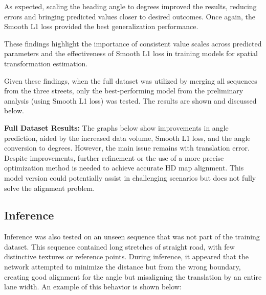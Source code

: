 As expected, scaling the heading angle to degrees improved the results, reducing errors and bringing predicted values closer to desired outcomes. Once again, the Smooth L1 loss provided the best generalization performance.

These findings highlight the importance of consistent value scales across predicted parameters and the effectiveness of Smooth L1 loss in training models for spatial transformation estimation.

Given these findings, when the full dataset was utilized by merging all sequences from the three streets, only the best-performing model from the preliminary analysis (using Smooth L1 loss) was tested. The results are shown and discussed below.

\textbf{Full Dataset Results:} The graphs below show improvements in angle prediction, aided by the increased data volume, Smooth L1 loss, and the angle conversion to degrees. However, the main issue remains with translation error. Despite improvements, further refinement or the use of a more precise optimization method is needed to achieve accurate HD map alignment. This model version could potentially assist in challenging scenarios but does not fully solve the alignment problem.

\subsection{Inference}
Inference was also tested on an unseen sequence that was not part of the training dataset. This sequence contained long stretches of straight road, with few distinctive textures or reference points. During inference, it appeared that the network attempted to minimize the distance but from the wrong boundary, creating good alignment for the angle but misaligning the translation by an entire lane width. An example of this behavior is shown below:
